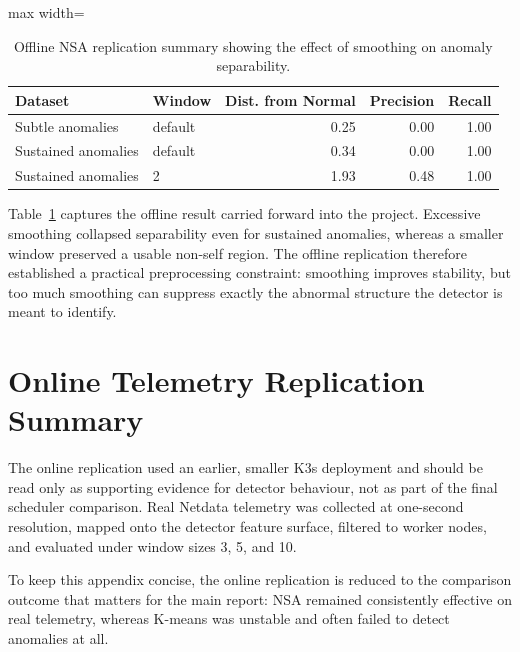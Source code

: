 \begin{appendices}
\begin{table}[h]
    \centering
    \begin{adjustbox}{max width=\textwidth}
    \begin{tabular}{llrrr}
        \hline
        \textbf{Dataset} & \textbf{Window} & \textbf{Dist. from Normal} & \textbf{Precision} & \textbf{Recall} \\
        \hline
        Subtle anomalies & default & 0.25 & 0.00 & 1.00 \\
        Sustained anomalies & default & 0.34 & 0.00 & 1.00 \\
        Sustained anomalies & 2 & 1.93 & 0.48 & 1.00 \\
        \hline
    \end{tabular}
    \end{adjustbox}
    \caption{Offline NSA replication summary showing the effect of smoothing on anomaly separability.}
    \label{tab:appendix-offline-replication}
\end{table}

Table~\ref{tab:appendix-offline-replication} captures the offline result carried forward into the project. Excessive smoothing collapsed separability even for sustained anomalies, whereas a smaller window preserved a usable non-self region. The offline replication therefore established a practical preprocessing constraint: smoothing improves stability, but too much smoothing can suppress exactly the abnormal structure the detector is meant to identify.

\section{Online Telemetry Replication Summary}

The online replication used an earlier, smaller K3s deployment and should be read only as supporting evidence for detector behaviour, not as part of the final scheduler comparison. Real Netdata telemetry was collected at one-second resolution, mapped onto the detector feature surface, filtered to worker nodes, and evaluated under window sizes 3, 5, and 10.

To keep this appendix concise, the online replication is reduced to the comparison outcome that matters for the main report: NSA remained consistently effective on real telemetry, whereas K-means was unstable and often failed to detect anomalies at all.


\end{appendices}
